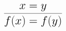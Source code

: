 \documentclass[14pt,border=2pt]{standalone}
\begin{document}
        $$
        \LARGE 

\begin{prooftree}
\hypo{x = y}
\infer1{f(x) = f(y)}
\end{prooftree}
        $$
        
\end{document}
